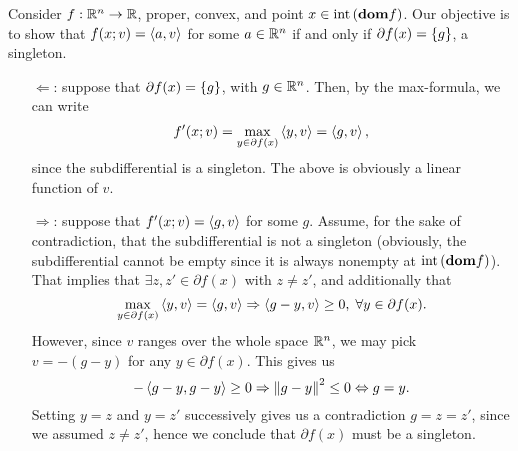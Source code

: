 \documentclass[10pt]{article}
\begin{document}
\vspace{1em}

\begin{Exercise}
	\label{ex:p3}
	Consider $f: \mathbb{R}^n \to \mathbb{R}$, proper, convex, and point $x \in \mathrm{int}\left( \textbf{dom}
	f \right)$. Our objective is to show that $f(x; v) = \left\langle a, v \right\rangle$ for some $a \in
	\mathbb{R}^n$ if and only if $\partial f(x) = \left\{ g \right\}$, a singleton.
	\begin{itemize}
		\item[$\Leftarrow$:] suppose that $\partial f(x) = \left\{ g \right\}$, with $g
			\in \mathbb{R}^n$. Then, by the max-formula, we can write
			\[
				f'(x; v) = \max_{y \in \partial f(x)} \left\langle y, v \right\rangle =
					\left\langle g, v \right\rangle,
			\]
			since the subdifferential is a singleton. The above is obviously a
			linear function of $v$.
		\item[$\Rightarrow$:] suppose that $f'(x; v) = \left\langle g, v \right\rangle$ for some $g$.
			Assume, for the sake of contradiction, that the subdifferential is
			not a singleton (obviously, the subdifferential cannot be empty
			since it is always nonempty at $\mathrm{int}\left( \textbf{dom} f \right)$). That implies that
            $\exists z, z' \in \partial f(x)$ with $z \neq z'$, and additionally
            that
			\[
				\max_{y \in \partial f(x)} \left\langle y, v \right\rangle = \left\langle g, v \right\rangle \Rightarrow
                \left\langle g - y, v \right\rangle \geq 0, \; \forall y \in \partial f(x).
			\]
            However, since $v$ ranges over the whole space $\mathbb{R}^n$, we may pick
            $v = -(g - y)$ for any $y \in \partial f(x)$. This gives us
            \[
                -\left\langle g - y, g - y \right\rangle \geq 0 \Rightarrow
                \left \| g - y \right \|^2 \leq 0 \Leftrightarrow g = y.
            \]
			Setting $y = z$ and $y = z'$ successively gives us a contradiction
            $ g = z = z' $, since we assumed $z \neq z'$, hence we conclude
            that $\partial f(x)$ must be a singleton.
	\end{itemize}
\end{Exercise}

\vspace{1em}
\end{document}
